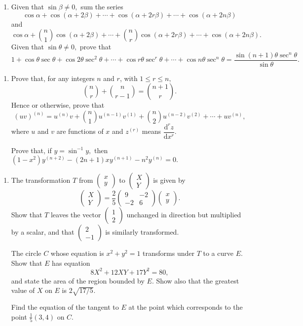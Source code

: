 \documentclass[a4, 11pt]{report}
\newlength{\qspace}
\newcounter{qnumber}
\newenvironment{question}%
 {\vspace{\qspace}
  \begin{enumerate}[\bfseries 1\quad][10]%
    \setcounter{enumi}{\value{qnumber}}%
    \item%
 }
{
  \end{enumerate}
  \filbreak
  \stepcounter{qnumber}
 }
\begin{document}

\begin{question}
Given that $\sin\beta\neq0,$ sum the series 
\[
\cos\alpha+\cos(\alpha+2\beta)+\cdots+\cos(\alpha+2r\beta)+\cdots+\cos(\alpha+2n\beta)
\]
and 
\[
\cos\alpha+\binom{n}{1}\cos(\alpha+2\beta)+\cdots+\binom{n}{r}\cos(\alpha+2r\beta)+\cdots+\cos(\alpha+2n\beta).
\]
Given that $\sin\theta\neq0,$ prove that 
\[
1+\cos\theta\sec\theta+\cos2\theta\sec^{2}\theta+\cdots+\cos r\theta\sec^{r}\theta+\cdots+\cos n\theta\sec^{n}\theta=\frac{\sin(n+1)\theta\sec^{n}\theta}{\sin\theta}.
\]

\end{question}


\begin{question}
Prove that, for any integers $n$ and $r$, with $1\leqslant r\leqslant n,$
\[
\binom{n}{r}+\binom{n}{r-1}=\binom{n+1}{r}.
\]
Hence or otherwise, prove that 
\[
(uv)^{(n)}=u^{(n)}v+\binom{n}{1}u^{(n-1)}v^{(1)}+\binom{n}{2}u^{(n-2)}v^{(2)}+\cdots+uv^{(n)},
\]
where $u$ and $v$ are functions of $x$ and $z^{(r)}$ means $\dfrac{\mathrm{d}^{r}z}{\mathrm{d}x^{r}}$. 


Prove that, if $y=\sin^{-1}y,$ then $(1-x^{2})y^{(n+2)}-(2n+1)xy^{(n+1)}-n^{2}y^{(n)}=0.$  
	\end{question}
	
	\begin{question}
The transformation $T$ from $\begin{pmatrix}x\\
y
\end{pmatrix}$ to $\begin{pmatrix}X\\
Y
\end{pmatrix}$ is given by 
\[
\begin{pmatrix}X\\
Y
\end{pmatrix}=\frac{2}{5}\begin{pmatrix}9 & -2\\
-2 & 6
\end{pmatrix}\begin{pmatrix}x\\
y
\end{pmatrix}.
\]
Show that $T$ leaves the vector $\begin{pmatrix}1\\
2
\end{pmatrix}$ unchanged in direction but multiplied by a scalar, and that $\begin{pmatrix}2\\
-1
\end{pmatrix}$ is similarly transformed. 


The circle $C$ whose equation is $x^{2}+y^{2}=1$ transforms under
$T$ to a curve $E$. Show that $E$ has equation 
\[
8X^{2}+12XY+17Y^{2}=80,
\]
and state the area of the region bounded by $E$. Show also that the
greatest value of $X$ on $E$ is $2\sqrt{17/5}.$ 


Find the equation of the tangent to $E$ at the point which corresponds
to the point $\frac{1}{5}(3,4)$ on $C$.
	 \end{question}
	 
\end{document}
